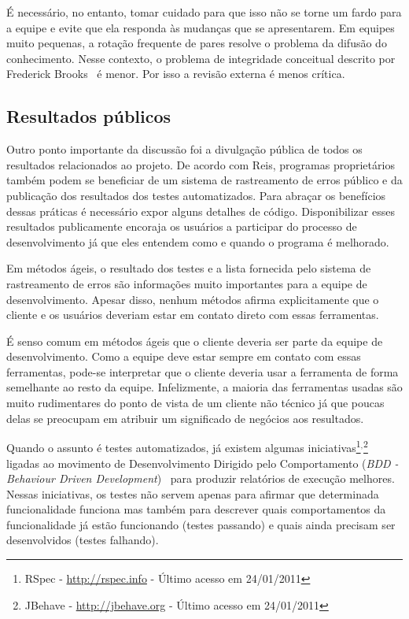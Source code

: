 É necessário, no entanto, tomar cuidado para que isso não se torne um
fardo para a equipe e evite que ela responda às mudanças que se
apresentarem. Em equipes muito pequenas, a rotação frequente de pares
resolve o problema da difusão do conhecimento. Nesse contexto, o
problema de integridade conceitual descrito por Frederick
Brooks~\cite{Brooks1975-mmme} é menor. Por isso a revisão externa é
menos crítica.

\subsection{Resultados públicos}
\label{subsec:publicity}

Outro ponto importante da discussão foi a divulgação pública de todos
os resultados relacionados ao projeto. De acordo com Reis, programas
proprietários também podem se beneficiar de um sistema de rastreamento
de erros público e da publicação dos resultados dos testes
automatizados. Para abraçar os benefícios dessas práticas é necessário
expor alguns detalhes de código. Disponibilizar esses resultados
publicamente encoraja os usuários a participar do processo de
desenvolvimento já que eles entendem como e quando o programa é
melhorado.

Em métodos ágeis, o resultado dos testes e a lista fornecida pelo
sistema de rastreamento de erros são informações muito importantes
para a equipe de desenvolvimento. Apesar disso, nenhum métodos afirma
explicitamente que o cliente e os usuários deveriam estar em contato
direto com essas ferramentas.

É senso comum em métodos ágeis que o cliente deveria ser parte da
equipe de desenvolvimento. Como a equipe deve estar sempre em contato
com essas ferramentas, pode-se interpretar que o cliente deveria usar
a ferramenta de forma semelhante ao resto da equipe. Infelizmente, a
maioria das ferramentas usadas são muito rudimentares do ponto de
vista de um cliente não técnico já que poucas delas se preocupam em
atribuir um significado de negócios aos resultados.

Quando o assunto é testes automatizados, já existem algumas
iniciativas\footnote{RSpec - \url{http://rspec.info} - Último acesso
  em 24/01/2011}$^{, }$\footnote{JBehave - \url{http://jbehave.org} -
  Último acesso em 24/01/2011} ligadas ao movimento de Desenvolvimento
Dirigido pelo Comportamento (\emph{BDD - Behaviour Driven
  Development})~\cite{North2006} para produzir relatórios de execução
melhores. Nessas iniciativas, os testes não servem apenas para afirmar
que determinada funcionalidade funciona mas também para descrever
quais comportamentos da funcionalidade já estão funcionando (testes
passando) e quais ainda precisam ser desenvolvidos (testes falhando).

